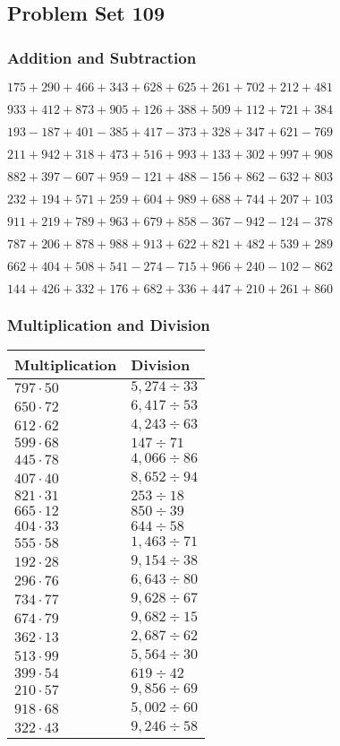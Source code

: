 \hypertarget{problem-set-109}{%
\subsection{Problem Set 109}\label{problem-set-109}}

\hypertarget{addition-and-subtraction}{%
\subsubsection{Addition and
Subtraction}\label{addition-and-subtraction}}

\(175 +290 +466 +343 +628 +625 +261 +702 +212 +481\)

\(933 +412 +873 +905 +126 +388 +509 +112 +721 +384\)

\(193 - 187 +401 - 385 +417 - 373 +328 +347 +621 - 769\)

\(211 +942 +318 +473 +516 +993 +133 +302 +997 +908\)

\(882 +397 - 607 +959 - 121 +488 - 156 +862 - 632 +803\)

\(232 +194 +571 +259 +604 +989 +688 +744 +207 +103\)

\(911 +219 +789 +963 +679 +858 - 367 - 942 - 124 - 378\)

\(787 +206 +878 +988 +913 +622 +821 +482 +539 +289\)

\(662 +404 +508 +541 - 274 - 715 +966 +240 - 102 - 862\)

\(144 +426 +332 +176 +682 +336 +447 +210 +261 +860\)

\hypertarget{multiplication-and-division}{%
\subsubsection{Multiplication and
Division}\label{multiplication-and-division}}

\begin{longtable}[]{@{}ll@{}}
\toprule
Multiplication & Division\tabularnewline
\midrule
\endhead
\(797 \cdot 50\) & \(5,274÷33\)\tabularnewline
\(650 \cdot 72\) & \(6,417÷53\)\tabularnewline
\(612 \cdot 62\) & \(4,243÷63\)\tabularnewline
\(599 \cdot 68\) & \(147÷71\)\tabularnewline
\(445 \cdot 78\) & \(4,066÷86\)\tabularnewline
\(407 \cdot 40\) & \(8,652÷94\)\tabularnewline
\(821 \cdot 31\) & \(253÷18\)\tabularnewline
\(665 \cdot 12\) & \(850÷39\)\tabularnewline
\(404 \cdot 33\) & \(644÷58\)\tabularnewline
\(555 \cdot 58\) & \(1,463÷71\)\tabularnewline
\(192 \cdot 28\) & \(9,154÷38\)\tabularnewline
\(296 \cdot 76\) & \(6,643÷80\)\tabularnewline
\(734 \cdot 77\) & \(9,628÷67\)\tabularnewline
\(674 \cdot 79\) & \(9,682÷15\)\tabularnewline
\(362 \cdot 13\) & \(2,687÷62\)\tabularnewline
\(513 \cdot 99\) & \(5,564÷30\)\tabularnewline
\(399 \cdot 54\) & \(619÷42\)\tabularnewline
\(210 \cdot 57\) & \(9,856÷69\)\tabularnewline
\(918 \cdot 68\) & \(5,002÷60\)\tabularnewline
\(322 \cdot 43\) & \(9,246÷58\)\tabularnewline
\bottomrule
\end{longtable}
